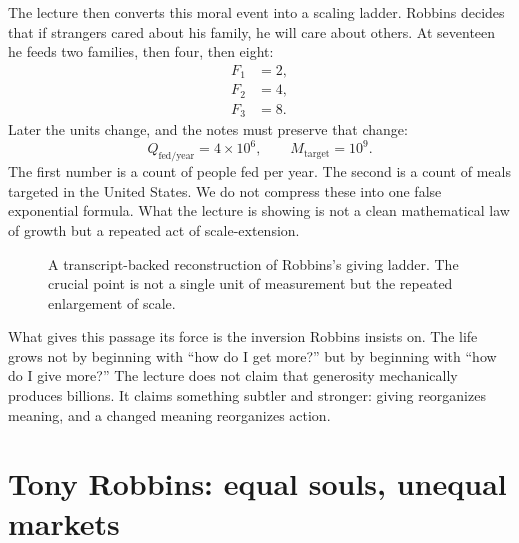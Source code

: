 The lecture then converts this moral event into a scaling ladder. Robbins decides that if strangers cared about his family, he will care about others. At seventeen he feeds two families, then four, then eight:
\begin{align}
F_1 &= 2,\\
F_2 &= 4,\\
F_3 &= 8.
\end{align}
Later the units change, and the notes must preserve that change:
\begin{equation}
Q_{\text{fed/year}} = 4\times 10^{6}, \qquad
M_{\text{target}} = 10^{9}.
\end{equation}
The first number is a count of people fed per year. The second is a count of meals targeted in the United States. We do not compress these into one false exponential formula. What the lecture is showing is not a clean mathematical law of growth but a repeated act of scale-extension.

\begin{figure}[h]
\centering
{}
\caption{A transcript-backed reconstruction of Robbins's giving ladder. The crucial point is not a single unit of measurement but the repeated enlargement of scale.}
\end{figure}

What gives this passage its force is the inversion Robbins insists on. The life grows not by beginning with ``how do I get more?'' but by beginning with ``how do I give more?'' The lecture does not claim that generosity mechanically produces billions. It claims something subtler and stronger: giving reorganizes meaning, and a changed meaning reorganizes action.

\section{Tony Robbins: equal souls, unequal markets}

